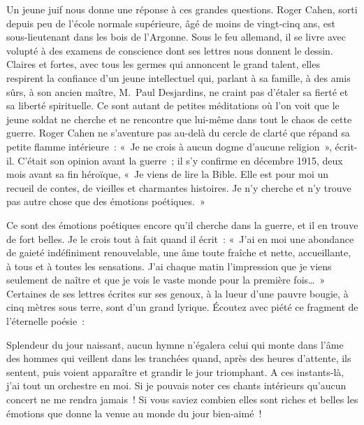 \documentclass[french,twoside]{book} %
\newenvironment{quoteblock}%
  {\begin{quoting}}
  {\end{quoting}}
\newenvironment{quotebar}{%
    \def\FrameCommand{{\color{rubric!10!}\vrule width 0.5em} \hspace{0.9em}}%
    \def\OuterFrameSep{\itemsep} %
    \MakeFramed {\advance\hsize-\width \FrameRestore}
  }%
  {%
    \endMakeFramed
  }
\renewenvironment{quoteblock}%
  {%
    \savenotes
    \setstretch{0.9}
    \normalfont
    \begin{quotebar}
  }
  {%
    \end{quotebar}
    \spewnotes
  }
\begin{document}
Un jeune juif nous donne une réponse à ces grandes questions. Roger Cahen, sorti depuis peu de l’école normale supérieure, âgé de moins de vingt-cinq ans, est sous-lieutenant dans les bois de l’Argonne. Sous le feu allemand, il se livre avec volupté à des examens de conscience dont ses lettres nous donnent le dessin. Claires et fortes, avec tous les germes qui annoncent le grand talent, elles respirent la confiance d’un jeune intellectuel qui, parlant à sa famille, à des amis sûrs, à son ancien maître, M. Paul Desjardins, ne craint pas d’étaler sa fierté et sa liberté spirituelle. Ce sont autant de petites méditations où l’on voit que le jeune soldat ne cherche et ne rencontre que lui-même dans tout le chaos de cette guerre. Roger Cahen ne s’aventure pas au-delà du cercle de clarté que répand sa petite flamme intérieure : « Je ne crois à aucun dogme d’aucune religion », écrit-il. C’était son opinion avant la guerre ; il s’y confirme en décembre 1915, deux mois avant sa fin héroïque, « Je viens de lire la Bible. Elle est pour moi un recueil de contes, de vieilles et charmantes histoires. Je n’y cherche et n’y trouve pas autre chose que des émotions poétiques. »‌\par
Ce sont des émotions poétiques encore qu’il cherche dans la guerre, et il en trouve de fort belles. Je le crois tout à fait quand il écrit : « J’ai en moi une abondance de gaieté indéfiniment renouvelable, une âme toute fraîche et nette, accueillante, à tous et à toutes les sensations. J’ai chaque matin l’impression que je viens seulement de naître et que je vois le vaste monde pour la première fois… » Certaines de ses lettres écrites sur ses genoux, à la lueur d’une pauvre bougie, à cinq mètres sous terre, sont d’un grand lyrique. Écoutez avec piété ce fragment de l’éternelle poésie :‌\par

\begin{quoteblock}
 \noindent Splendeur du jour naissant, aucun hymne n’égalera celui qui monte dans l’âme des hommes qui veillent dans les tranchées quand, après des heures d’attente, ils sentent, puis voient apparaître et grandir le jour triomphant. A ces instants-là, j’ai tout un orchestre en moi. Si je pouvais noter ces chants intérieurs qu’aucun concert ne me rendra jamais ! Si vous saviez combien elles sont riches et belles les émotions que donne la venue au monde du jour bien-aimé !‌
 \end{quoteblock}
\end{document}
